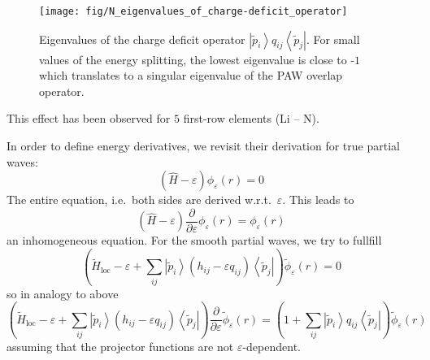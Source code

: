 \documentclass[oribibl]{llncs}
\newcommand{\um}[1]{_{\mathrm{#1}}}
\newcommand{\ket}[1]{\left| #1 \right\rangle}
\newcommand{\bra}[1]{\left\langle #1 \right|}
\begin{document}
\begin{figure} [ht]
  \centering
  \begin{minipage}[c]{.990\textwidth}
	\texttt{[image: fig/N\_eigenvalues\_of\_charge-deficit\_operator]} %
  \end{minipage}\hfill
  \begin{minipage}[c]{.009\textwidth}
  \end{minipage}
  \caption{Eigenvalues of the charge deficit operator $\ket{\tilde{p}_i} q_{ij} \bra{\tilde{p}_j}$.
  For small values of the energy splitting, the lowest eigenvalue is close to -$1$ which translates
  to a singular eigenvalue of the \ac{PAW} overlap operator.
  } \label{fig:eigenvalues_of_charge-deficit_operator}
\end{figure}

This effect has been observed for $5$ first-row elements (Li -- N).

\newpage

In order to define energy derivatives, we revisit their derivation for true partial waves:
\begin{equation}
  \left( \hat H - \varepsilon \right) \phi_\varepsilon(r) = 0
\end{equation}
The entire equation, i.e.~both sides are derived w.r.t.~$\varepsilon$. This leads to
\begin{equation}
  \left( \hat H - \varepsilon \right) \frac{\partial}{\partial \varepsilon} \phi_\varepsilon(r) = \phi_\varepsilon(r)
\end{equation}
an inhomogeneous equation.
For the smooth partial waves, we try to fullfill
\begin{equation}
  \left( \tilde H\um{loc} - \varepsilon + \sum_{ij} \ket{\tilde p_i} (h_{ij} - \varepsilon q_{ij} ) \bra{\tilde p_j} \right) \tilde{\phi}_\varepsilon(r) = 0
\end{equation}
so in analogy to above
\begin{equation}
  \left( \tilde H\um{loc} - \varepsilon + \sum_{ij} \ket{\tilde p_i} (h_{ij} - \varepsilon q_{ij} ) \bra{\tilde p_j} \right) 
  \frac{\partial}{\partial \varepsilon} \tilde{\phi}_\varepsilon(r) = \left( 1 + \sum_{ij} \ket{\tilde p_i} q_{ij} \bra{\tilde p_j} \right) \tilde{\phi}_\varepsilon(r)
\end{equation}
assuming that the projector functions are not $\varepsilon$-dependent.

\newpage





\end{document}
